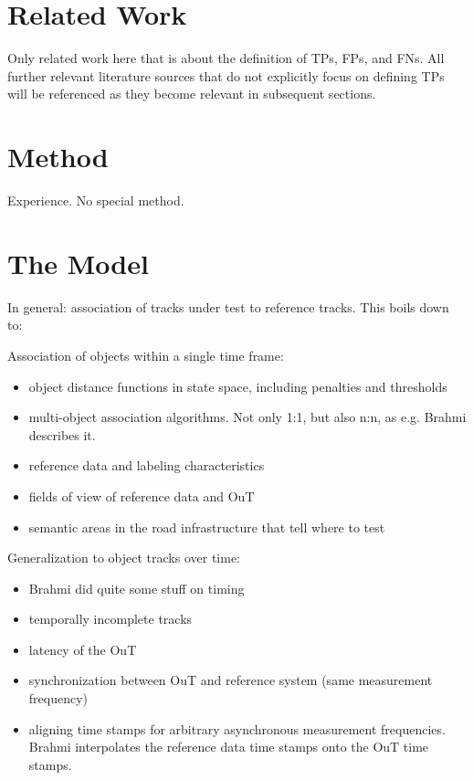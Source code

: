 \documentclass[conference]{IEEEtran}
\begin{document}
\section{Related Work}
\label{sec:related_work}

Only related work here that is about the definition of TPs, FPs, and FNs. 
All further relevant literature sources that do not explicitly focus on defining TPs will be referenced as they become relevant in subsequent sections. 


\section{Method}
\label{key}

Experience. No special method. 

\section{The Model}

In general: association of tracks under test to reference tracks. This boils down to:

Association of objects within a single time frame:
\begin{itemize}
\item object distance functions in state space, including penalties and thresholds
\item multi-object association algorithms. Not only 1:1, but also n:n, as e.g. Brahmi \cite[Sec. 10.3]{Brahmi2020diss} describes it.
\item reference data and labeling characteristics
\item fields of view of reference data and OuT
\item semantic areas in the road infrastructure that tell where to test
\end{itemize}

Generalization to object tracks over time:
\begin{itemize}
\item Brahmi \cite{Brahmi2020diss} did quite some stuff on timing
\item temporally incomplete tracks 
\item latency of the OuT
\item synchronization between OuT and reference system (same measurement frequency)
\item aligning time stamps for arbitrary asynchronous measurement frequencies. Brahmi \cite[Sec. 10.2.7]{Brahmi2020diss} interpolates the reference data time stamps onto the OuT time stamps.
\end{itemize}
\end{document}
